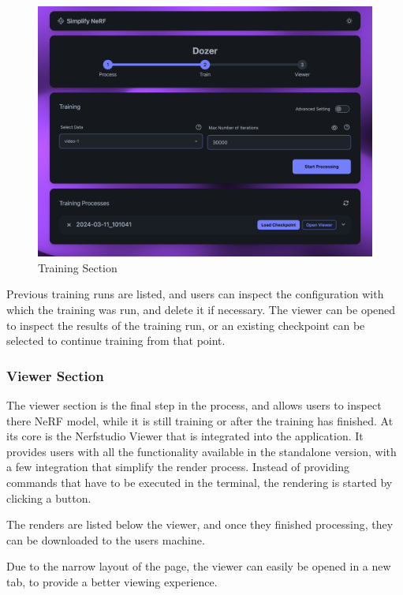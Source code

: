 \begin{figure}[htb]
  \includegraphics[width=\textwidth]{figures/view-train.png}
  \caption{Training Section}
  \label{fig:design:training-section}
\end{figure}


Previous training runs are listed, and users can inspect the configuration with which the training was run, and delete it if necessary. 
The viewer can be opened to inspect the results of the training run, or an existing checkpoint can be selected to continue training from that point.

\subsubsection{Viewer Section}

The viewer section is the final step in the process, and allows users to inspect there NeRF model, while it is still training or after the training has finished.
At its core is the Nerfstudio Viewer that is integrated into the application. 
It provides users with all the functionality available in the standalone version, with a few integration that simplify the render process.
Instead of providing commands that have to be executed in the terminal, the rendering is started by clicking a button.

The renders are listed below the viewer, and once they finished processing, they can be downloaded to the users machine.

Due to the narrow layout of the page, the viewer can easily be opened in a new tab, to provide a better viewing experience.

